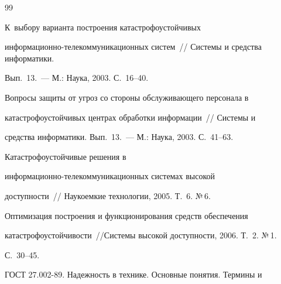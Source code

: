 {\small\frenchspacing


{%




\begin{thebibliography}{99}









     К~выбору варианта построения катастрофоустойчивых 


     информационно-телекоммуникационных систем~/\!\!/ Системы и средства информатики. 


Вып.~13.~--- М.: Наука, 2003. С.~16--40.






     Вопросы защиты от угроз со стороны обслуживающего персонала в 


катастрофоустойчивых центрах обработки информации~/\!\!/ Системы и 


средства информатики. Вып.~13.~--- М.: Наука, 2003.  С.~41--63.






     Катастрофоустойчивые решения в 


     ин\-фор\-ма\-ци\-он\-но-телекоммуникационных системах высокой 


доступности~/\!\!/ Наукоемкие технологии, 2005.  Т.~6. №\,6.


     






     Оптимизация построения и функционирования средств обеспечения 


катастрофоустойчивости~/\!\!/Системы высокой доступности, 2006. Т.~2. №\,1. 


С.~30--45.


     


     




     ГОСТ 27.002-89. Надежность в технике. Основные понятия. Термины и 



\end{thebibliography}}}
